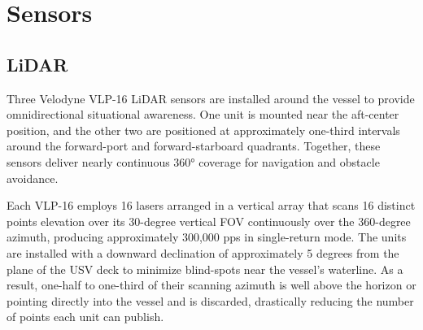 \documentclass{erauthesis}
\begin{document}

\section{Sensors} \label{sensors}

\subsection{LiDAR} \label{sensors_LiDAR}
% 


Three Velodyne VLP-16 \ac{LiDAR} sensors are installed around the vessel to provide omnidirectional situational awareness. 
One unit is mounted near the aft-center position, and the other two are positioned at approximately one-third intervals around the forward-port and forward-starboard quadrants. 
Together, these sensors deliver nearly continuous 360° coverage for navigation and obstacle avoidance.

Each VLP-16 employs 16 lasers arranged in a vertical array that scans 16 distinct points elevation over its 30-degree vertical \ac{FOV} continuously over the 360-degree azimuth, producing approximately 300,000 \ac{pps} in single-return mode. 
The units are installed with a downward declination of approximately 5 degrees from the plane of the \ac{USV} deck to minimize blind-spots near the vessel's waterline.
As a result, one-half to one-third of their scanning azimuth is well above the horizon or pointing directly into the vessel and is discarded, drastically reducing the number of points each unit can publish.
\end{document}
